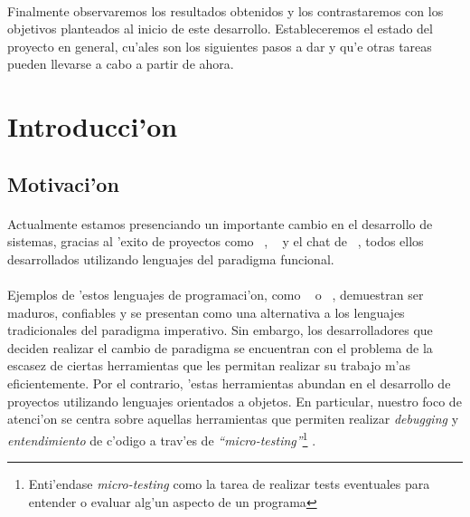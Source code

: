 \documentclass[a4paper]{article}
\begin{document}
\paragraph{}Finalmente observaremos los resultados obtenidos y los contrastaremos con los objetivos planteados al inicio de este desarrollo.  Estableceremos el estado del proyecto en general, cu'ales son los siguientes pasos a dar y qu'e otras tareas pueden llevarse a cabo a partir de ahora.

\newpage
\section{Introducci'on}
\subsection{Motivaci'on}
\begin{epigraphs}
\end{epigraphs}
\paragraph{}Actualmente estamos presenciando un importante cambio en el desarrollo de sistemas, gracias al 'exito de proyectos como ~\cite{couchdb}, ~\cite{ejabberd} y el chat de ~\cite{facebook}, todos ellos desarrollados utilizando lenguajes del paradigma funcional.
\paragraph{}Ejemplos de 'estos lenguajes de programaci'on, como ~\cite{haskell} o ~\cite{erlang}, demuestran ser maduros, confiables y se presentan como una alternativa a los lenguajes tradicionales del paradigma imperativo.  Sin embargo, los desarrolladores que deciden realizar el cambio de paradigma se encuentran con el problema de la escasez de ciertas herramientas que les permitan realizar su trabajo m'as eficientemente.  Por el contrario, 'estas herramientas abundan en el desarrollo de proyectos utilizando lenguajes orientados a objetos.  En particular, nuestro foco de atenci'on se centra sobre aquellas herramientas que permiten realizar \textsl{debugging} y \textsl{entendimiento} de c'odigo a trav'es de \textsl{``micro-testing''}\footnote{Enti'endase \textsl{micro-testing} como la tarea de realizar tests eventuales para entender o evaluar alg'un aspecto de un programa} .
\end{document}
